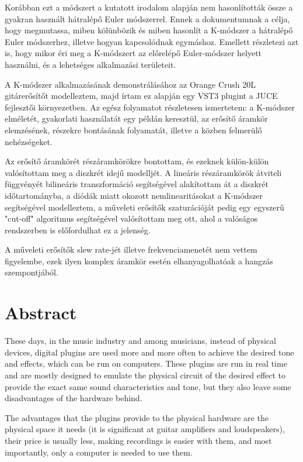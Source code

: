 Korábban ezt a módszert a kutatott irodalom alapján nem hasonlították össze a gyakran használt hátralépő Euler módszerrel. Ennek a dokumentumnak a célja, hogy megmutassa, miben 
kölünbözik és miben hasonlít a K-módszer a hátralépő Euler módszerhez, illetve hogyan kapcsolódnak egymáshoz. Emellett részletezi azt is, hogy mikor éri meg a K-módszert az 
előrelépő Euler-módszer helyett használni, és a lehetséges alkalmazási területeit.

A K-módszer alkalmazásának demonstrálásához az Orange Crush 20L gitárerősítőt modelleztem, majd írtam ez alapján egy VST3 plugint a JUCE fejlesztői környezetben. Az egész folyamatot 
részletesen ismertetem: a K-módszer elméletét, gyakorlati használatát egy példán keresztül, az erősítő áramkör elemzésének, részekre bontásának folyamatát, illetve a közben 
felmerülő nehézségeket.

Az erősítő áramkörét részáramkörökre bontottam, és ezeknek külön-külön valósítottam meg a diszkrét idejű modelljét. A lineáris részáramkörök
átviteli függvényét bilineáris transzformáció segítségével alakítottam át a diszkrét időtartományba, a diódák miatt okozott nemlinearitásokat
a K-módszer segítségével modelleztem, a műveleti erősítők szaturációját pedig egy egyszerű "cut-off" algoritmus segítségével valósítottam meg ott,
ahol a valóságos rendszerben is előfordulhat ez a jelenség.

A műveleti erősítők slew rate-jét illetve frekvenciamenetét nem vettem figyelembe, ezek ilyen komplex áramkör esetén elhanyagolhatóak a hangzás szempontjából.\vfill


\chapter*{Abstract}
These days, in the music industry and among musicians, instead of physical devices, digital plugins are used more and more often to achieve 
the desired tone and effects, which can be run on computers. These plugins are run in real time and are mostly designed to emulate the 
physical circuit of the desired effect to provide the exact same sound characteristics and tone, but they also leave some disadvantages 
of the hardware behind.

The advantages that the plugins provide to the physical hardware are the physical space it needs (it is significant at guitar amplifiers 
and loudspeakers), their price is usually less, making recordings is easier with them, and most importantly, only a computer is needed to 
use them.

